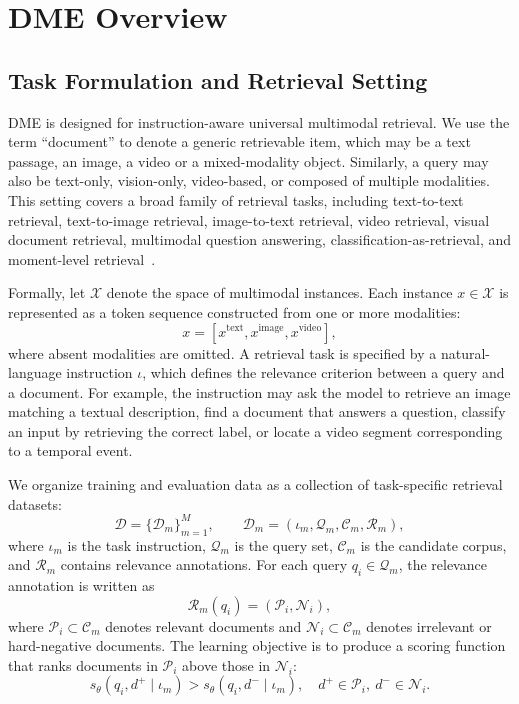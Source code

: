 \section{DME Overview}
\label{sec:dme-overview}

\subsection{Task Formulation and Retrieval Setting}
\label{sec:task-formulation}

DME is designed for instruction-aware universal multimodal retrieval. We use the term ``document'' to denote a generic retrievable item, which may be a text passage, an image, a video or a mixed-modality object. Similarly, a query may also be text-only, vision-only, video-based, or composed of multiple modalities. This setting covers a broad family of retrieval tasks, including text-to-text retrieval, text-to-image retrieval, image-to-text retrieval, video retrieval, visual document retrieval, multimodal question answering, classification-as-retrieval, and moment-level retrieval~\cite{MMEB,VLM2VecV2,Qwen3VLEmbedding,ColPali,visrag}.

Formally, let $\mathcal{X}$ denote the space of multimodal instances. Each instance $x \in \mathcal{X}$ is represented as a token sequence constructed from one or more modalities:
\begin{equation}
    x = [x^{\mathrm{text}}, x^{\mathrm{image}}, x^{\mathrm{video}}],
\end{equation}
where absent modalities are omitted. A retrieval task is specified by a natural-language instruction $\iota$, which defines the relevance criterion between a query and a document. For example, the instruction may ask the model to retrieve an image matching a textual description, find a document that answers a question, classify an input by retrieving the correct label, or locate a video segment corresponding to a temporal event.

We organize training and evaluation data as a collection of task-specific retrieval datasets:
\begin{equation}
    \mathcal{D} = \{\mathcal{D}_m\}_{m=1}^{M},
    \qquad
    \mathcal{D}_m = (\iota_m, \mathcal{Q}_m, \mathcal{C}_m, \mathcal{R}_m),
\end{equation}
where $\iota_m$ is the task instruction, $\mathcal{Q}_m$ is the query set, $\mathcal{C}_m$ is the candidate corpus, and $\mathcal{R}_m$ contains relevance annotations. For each query $q_i \in \mathcal{Q}_m$, the relevance annotation is written as
\begin{equation}
    \mathcal{R}_m(q_i) = (\mathcal{P}_i, \mathcal{N}_i),
\end{equation}
where $\mathcal{P}_i \subset \mathcal{C}_m$ denotes relevant documents and $\mathcal{N}_i \subset \mathcal{C}_m$ denotes irrelevant or hard-negative documents. The learning objective is to produce a scoring function that ranks documents in $\mathcal{P}_i$ above those in $\mathcal{N}_i$:
\begin{equation}
    s_\theta(q_i, d^+ \mid \iota_m) > s_\theta(q_i, d^- \mid \iota_m),
    \quad
    d^+ \in \mathcal{P}_i,\ d^- \in \mathcal{N}_i.
\end{equation}

